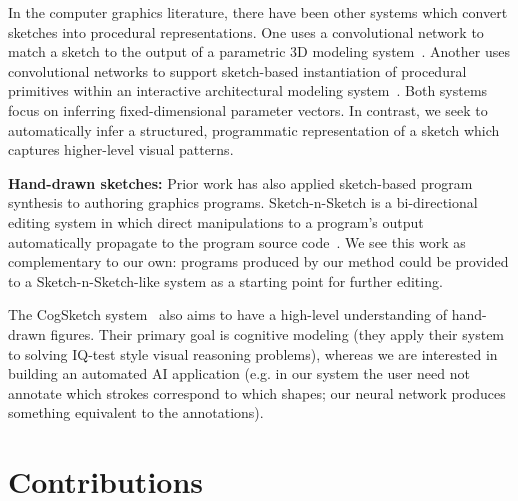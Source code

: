 \documentclass{article}
\theoremstyle{definition}
\begin{document}
\begin{table}[h]

In the computer graphics literature, there have been other systems which convert sketches into procedural representations. One uses a convolutional network to match a sketch to the output of a parametric 3D modeling system~\citep{huang2017shape}. Another uses convolutional networks to support sketch-based instantiation of procedural primitives within an interactive architectural modeling system~\citep{Nishida:2016:ISU:2897824.2925951}. Both systems focus on inferring fixed-dimensional parameter vectors. In contrast, we seek to automatically infer a structured, programmatic representation of a sketch which captures higher-level visual patterns.

\textbf{Hand-drawn sketches:} Prior work has also applied sketch-based program synthesis to authoring graphics programs. Sketch-n-Sketch is a bi-directional editing system in which direct manipulations to a program's output automatically propagate to the program source code~\citep{Hempel:2016:SSP:2984511.2984575}. We see this work as complementary to our own: programs produced by our method could be provided to a Sketch-n-Sketch-like system as a starting point for further editing.

The CogSketch system~\citep{forbus2011cogsketch} also aims to have a high-level understanding of hand-drawn figures. Their primary goal is cognitive modeling (they apply their system to solving IQ-test style visual reasoning problems), whereas we are interested in building an automated AI application (e.g. in our system the user need not annotate which strokes correspond to which shapes; our neural network produces something equivalent to the annotations).

\section{Contributions}


\end{table}
\end{document}

